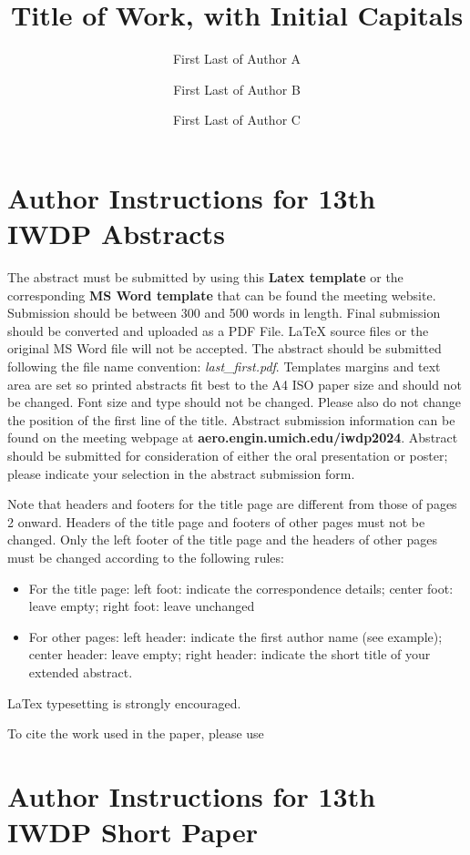 \documentclass[11pt,letterpaper]{article}
\date{}
\title{Title of Work, with Initial Capitals}
\author[1]{First Last of Author A}
\author[2]{First Last of Author B}
\author[1]{First Last of Author C}
\affil[1]{Department of Frozen Land, University of South Pole}
\affil[2]{Department of Icicle Engineering, University of North Pole}
\begin{document}
\maketitle


\section{Author Instructions for 13th IWDP Abstracts}
The abstract must be submitted by using this \textbf{Latex template} or the corresponding \textbf{MS Word template} that can be found the meeting website. Submission should be between 300 and 500 words in length. Final submission should be converted and uploaded as a PDF File. LaTeX source files or the original MS Word file will not be accepted.  The abstract should be submitted following the file name convention: \emph{last\_first.pdf}. Templates margins and text area are set so printed abstracts fit best to the A4 ISO paper size and should not be changed. Font size and type should not be changed. Please also do not change the position of the first line of the title. Abstract submission information can be found on the meeting webpage at \textbf{aero.engin.umich.edu/iwdp2024}. Abstract should be submitted for consideration of either the oral presentation or poster; please indicate your selection in the abstract submission form.

 

Note that headers and footers for the title page are different from those of pages 2 onward. Headers of the title page and footers of other pages must not be changed.
Only the left footer of the title page and the headers of other pages must be changed according to the following rules:
\begin{itemize}
    \item For the title page: left foot: indicate the correspondence details; center foot: leave empty; right foot: leave unchanged
    \item  For other pages: left header: indicate the first author name (see example); center header: leave empty; right header: indicate the short title of your extended abstract.
\end{itemize}
LaTex typesetting is strongly encouraged.

To cite the work used in the paper, please use \cite{Bykovskii2006, kailasanath2000review, Lu2014review}


\section{Author Instructions for 13th IWDP Short Paper}
\end{document}
